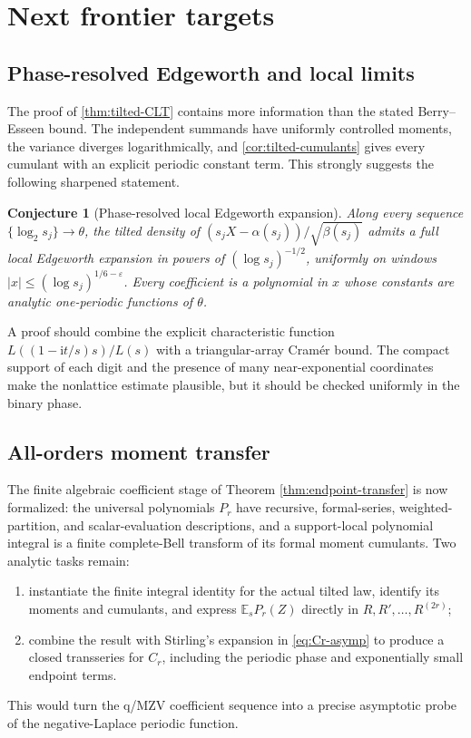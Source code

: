 \documentclass[11pt,oneside]{article}
\newtheorem{conjecture}[theorem]{Conjecture}
\theoremstyle{definition}
\theoremstyle{remark}
\newcommand{\ii}{\mathrm i}
\newcommand{\E}{\mathbb E}
\begin{document}
\section{Next frontier targets}

\subsection{Phase-resolved Edgeworth and local limits}

The proof of \cref{thm:tilted-CLT} contains more information than the stated
Berry--Esseen bound.  The independent summands have uniformly controlled
moments, the variance diverges logarithmically, and
\cref{cor:tilted-cumulants} gives every cumulant with an explicit periodic
constant term.  This strongly suggests the following sharpened statement.

\begin{conjecture}[Phase-resolved local Edgeworth expansion]
\label{conj:Edgeworth}
Along every sequence $\{\log_2s_j\}\to\theta$, the tilted density of
$(s_jX-\alpha(s_j))/\sqrt{\beta(s_j)}$ admits a full local Edgeworth expansion
in powers of $(\log s_j)^{-1/2}$, uniformly on windows
$|x|\le(\log s_j)^{1/6-\varepsilon}$.  Every coefficient is a polynomial in
$x$ whose constants are analytic one-periodic functions of $\theta$.
\end{conjecture}

A proof should combine the explicit characteristic function
$L((1-\ii t/s)s)/L(s)$ with a triangular-array Cram\'er bound.  The compact
support of each digit and the presence of many near-exponential coordinates
make the nonlattice estimate plausible, but it should be checked uniformly in
the binary phase.

\subsection{All-orders moment transfer}

The finite algebraic coefficient stage of Theorem \ref{thm:endpoint-transfer}
is now formalized: the universal polynomials \(P_r\) have recursive,
formal-series, weighted-partition, and scalar-evaluation descriptions, and a
support-local polynomial integral is a finite complete-Bell transform of its
formal moment cumulants.  Two analytic tasks remain:
\begin{enumerate}
\item instantiate the finite integral identity for the actual tilted law,
      identify its moments and cumulants, and express
      $\E_sP_r(Z)$ directly in $R,R',\dots,R^{(2r)}$;
\item combine the result with Stirling's expansion in \cref{eq:Cr-asymp} to
      produce a closed transseries for $C_r$, including the periodic phase and
      exponentially small endpoint terms.
\end{enumerate}
This would turn the q/MZV coefficient sequence into a precise asymptotic probe
of the negative-Laplace periodic function.
\end{document}
